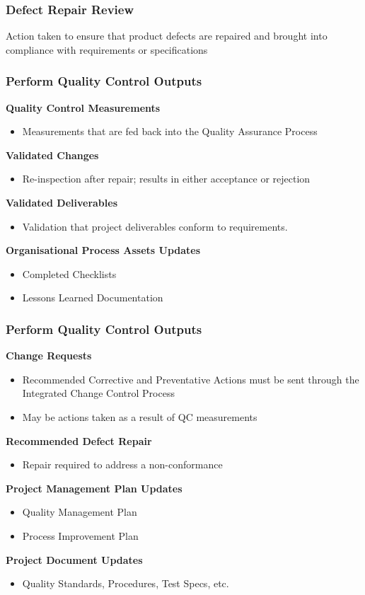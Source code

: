 \begin{frame}
\frametitle{Defect Repair Review}
Action taken to ensure that product defects are repaired and brought into compliance with requirements or specifications
\end{frame}




\begin{frame}
\frametitle{Perform Quality Control \hfill Outputs}
\textbf{Quality Control Measurements}
\begin{itemize}
	\item Measurements that are fed back into the Quality Assurance Process
\end{itemize}
\textbf{Validated Changes}
\begin{itemize}
	\item Re-inspection after repair; results in either acceptance or rejection
\end{itemize}
\textbf{Validated Deliverables}
\begin{itemize}
	\item Validation that project deliverables conform to requirements.
\end{itemize}
\textbf{Organisational Process Assets Updates}
\begin{itemize}
	\item Completed Checklists
	\item Lessons Learned Documentation
\end{itemize}
\end{frame}




\begin{frame}
\frametitle{Perform Quality Control \hfill Outputs}
\textbf{Change Requests}
\begin{itemize}
	\item Recommended Corrective and Preventative Actions must be sent through the Integrated Change Control Process
	\item May be actions taken as a result of QC measurements
\end{itemize}
\textbf{Recommended Defect Repair}
\begin{itemize}
	\item Repair required to address a non-conformance
\end{itemize}
\textbf{Project Management Plan Updates}
\begin{itemize}
	\item Quality Management Plan
	\item Process Improvement Plan
\end{itemize}
\textbf{Project Document Updates}
\begin{itemize}
	\item Quality Standards, Procedures, Test Specs, etc.
\end{itemize}
\end{frame}





